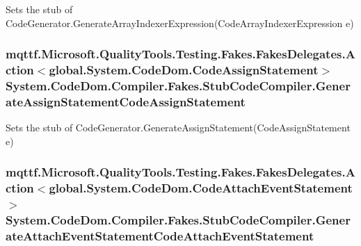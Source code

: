 Sets the stub of Code\-Generator.\-Generate\-Array\-Indexer\-Expression(\-Code\-Array\-Indexer\-Expression e)

\hypertarget{class_system_1_1_code_dom_1_1_compiler_1_1_fakes_1_1_stub_code_compiler_a1dd918dcededb2e60b99aa4370d58f37}{
\subsubsection[{Generate\-Assign\-Statement\-Code\-Assign\-Statement}]{\setlength{\rightskip}{0pt plus 5cm}mqttf.\-Microsoft.\-Quality\-Tools.\-Testing.\-Fakes.\-Fakes\-Delegates.\-Action$<$global.\-System.\-Code\-Dom.\-Code\-Assign\-Statement$>$ System.\-Code\-Dom.\-Compiler.\-Fakes.\-Stub\-Code\-Compiler.\-Generate\-Assign\-Statement\-Code\-Assign\-Statement}}\label{class_system_1_1_code_dom_1_1_compiler_1_1_fakes_1_1_stub_code_compiler_a1dd918dcededb2e60b99aa4370d58f37}


Sets the stub of Code\-Generator.\-Generate\-Assign\-Statement(\-Code\-Assign\-Statement e)

\hypertarget{class_system_1_1_code_dom_1_1_compiler_1_1_fakes_1_1_stub_code_compiler_a8ce1e95b3776caef8afa6fa1fc0305f7}{
\subsubsection[{Generate\-Attach\-Event\-Statement\-Code\-Attach\-Event\-Statement}]{\setlength{\rightskip}{0pt plus 5cm}mqttf.\-Microsoft.\-Quality\-Tools.\-Testing.\-Fakes.\-Fakes\-Delegates.\-Action$<$global.\-System.\-Code\-Dom.\-Code\-Attach\-Event\-Statement$>$ System.\-Code\-Dom.\-Compiler.\-Fakes.\-Stub\-Code\-Compiler.\-Generate\-Attach\-Event\-Statement\-Code\-Attach\-Event\-Statement}}\label{class_system_1_1_code_dom_1_1_compiler_1_1_fakes_1_1_stub_code_compiler_a8ce1e95b3776caef8afa6fa1fc0305f7}


